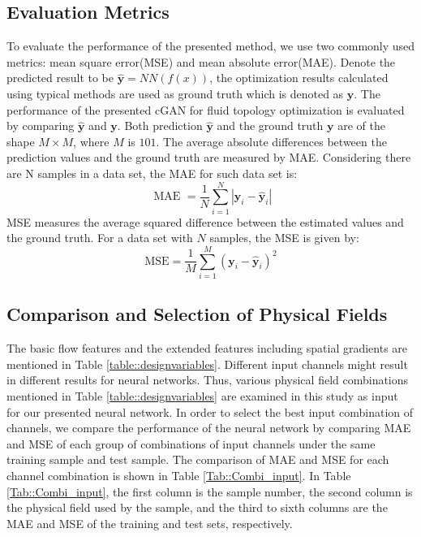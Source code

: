 \documentclass{article}
\begin{document}
\subsection{Evaluation Metrics}
To evaluate the performance of the presented method, we use two commonly used metrics: mean square error(MSE) and mean absolute error(MAE). Denote the predicted result to be  $\hat{\mathbf{y}}=NN(f(x))$, the optimization results calculated using typical methods are used as ground truth which is denoted as $\mathbf{y}$. The performance of the presented cGAN for fluid topology optimization is evaluated by comparing $\hat{\mathbf{y}}$ and $\mathbf{y}$. Both prediction $\hat{\mathbf{y}}$ and the ground truth $\mathbf{y}$ are of the shape $M \times M$, where $M$ is $101$. The average absolute differences between the prediction values and the ground truth are measured by MAE. Considering there are N samples in a data set,  the MAE for such data set is:
\begin{equation}\label{eq::MAE}
\text { MAE }=\frac{1}{N} \sum_{i=1}^N\left|\mathbf{y}_{i}-\hat{\mathbf{y}}_{i}\right|
\end{equation}
MSE measures the average squared difference between the estimated values and the ground truth. For a data set with $N$ samples, the MSE is given by:
\begin{equation}\label{eq::MSE}
\mathrm{MSE}=\frac{1}{M} \sum_{i=1}^M\left(\mathbf{y}_{i}-\hat{\mathbf{y}}_{i}\right)^2
\end{equation}
\subsection{Comparison and Selection of Physical Fields}

The basic flow features and the extended features including spatial gradients are mentioned in Table \ref{table::designvariables}. Different input channels might result in different results for neural networks. Thus, various physical field combinations mentioned in Table \ref{table::designvariables} are examined in this study as input for our presented neural network. In order to select the best input combination of channels, we compare the performance of the neural network by comparing MAE and MSE of each group of combinations of input channels under the same training sample and test sample. The comparison of MAE and MSE for each channel combination is shown in Table \ref{Tab::Combi_input}. In Table \ref{Tab::Combi_input}, the first column is the sample number, the second column is the physical field used by the sample, and the third to sixth columns are the MAE and MSE of the training and test sets, respectively.
\end{document}
